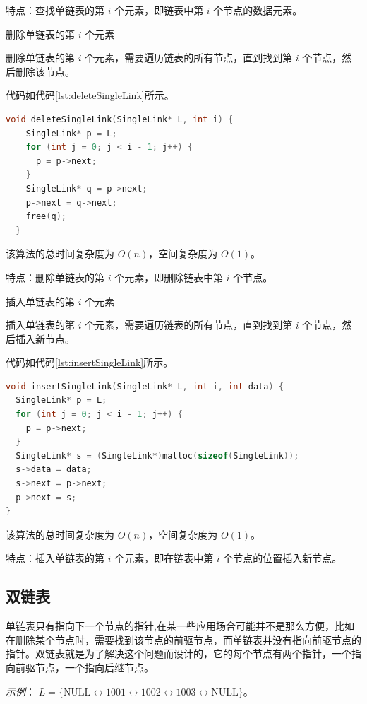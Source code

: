 \documentclass[lang=cn,newtx,10pt,scheme=chinese]{elegantbook}
\begin{document}
特点：查找单链表的第 $i$ 个元素，即链表中第 $i$ 个节点的数据元素。

删除单链表的第 $i$ 个元素

删除单链表的第 $i$ 个元素，需要遍历链表的所有节点，直到找到第 $i$ 个节点，然后删除该节点。

代码如代码\ref{lst:deleteSingleLink}所示。

\begin{lstlisting}[language=C++, caption={删除单链表的第 $i$ 个元素示例代码}, label={lst:deleteSingleLink}]
  void deleteSingleLink(SingleLink* L, int i) {
    SingleLink* p = L;
    for (int j = 0; j < i - 1; j++) {
      p = p->next;
    }
    SingleLink* q = p->next;
    p->next = q->next;
    free(q);
  }
  \end{lstlisting}
  该算法的总时间复杂度为 $O(n)$，空间复杂度为 $O(1)$。

  特点：删除单链表的第 $i$ 个元素，即删除链表中第 $i$ 个节点。

插入单链表的第 $i$ 个元素

插入单链表的第 $i$ 个元素，需要遍历链表的所有节点，直到找到第 $i$ 个节点，然后插入新节点。

代码如代码\ref{lst:insertSingleLink}所示。

\begin{lstlisting}[language=C++, caption={插入单链表的第 $i$ 个元素示例代码}, label={lst:insertSingleLink}]
void insertSingleLink(SingleLink* L, int i, int data) {
  SingleLink* p = L;
  for (int j = 0; j < i - 1; j++) {
    p = p->next;
  }
  SingleLink* s = (SingleLink*)malloc(sizeof(SingleLink));
  s->data = data;
  s->next = p->next;
  p->next = s;
}
\end{lstlisting}
该算法的总时间复杂度为 $O(n)$，空间复杂度为 $O(1)$。

特点：插入单链表的第 $i$ 个元素，即在链表中第 $i$ 个节点的位置插入新节点。
   



  \subsection{双链表}
  单链表只有指向下一个节点的指针,在某一些应用场合可能并不是那么方便，比如在删除某个节点时，需要找到该节点的前驱节点，而单链表并没有指向前驱节点的指针。双链表就是为了解决这个问题而设计的，它的每个节点有两个指针，一个指向前驱节点，一个指向后继节点。
  
  \textit{示例}：
  $L = \{\text{NULL} \leftrightarrow 1001 \leftrightarrow 1002 \leftrightarrow 1003 \leftrightarrow \text{NULL}\}$。
\end{document}
